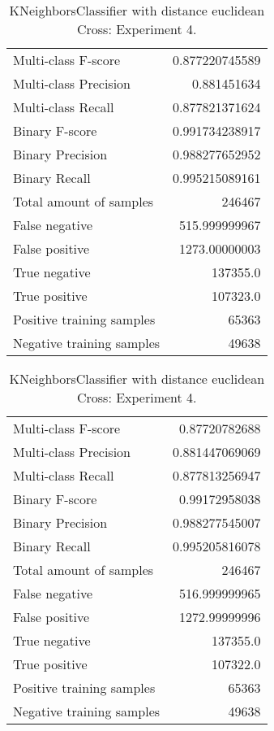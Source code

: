 \begin{table}[H]
\begin{minipage}{0.5\textwidth}
\caption{KNeighborsClassifier with distance euclidean Cross: Experiment 3.}
\centering
\begin{tabular}{l r}
\toprule
Multi-class F-score & 0.877220745589 \\
Multi-class Precision & 0.881451634 \\
Multi-class Recall & 0.877821371624 \\
\midrule
Binary F-score & 0.991734238917 \\
Binary Precision & 0.988277652952 \\
Binary Recall & 0.995215089161 \\
\midrule
Total amount of samples & 246467 \\
False negative & 515.999999967 \\
False positive & 1273.00000003 \\
True negative & 137355.0 \\
True positive & 107323.0 \\
\midrule
Positive training samples & 65363 \\
Negative training samples & 49638 \\
\bottomrule
\end{tabular}
\end{minipage}
\hfillx
\begin{minipage}{0.5\textwidth}
\caption{KNeighborsClassifier with distance euclidean Cross: Experiment 4.}
\centering
\begin{tabular}{l r}
\toprule
Multi-class F-score & 0.87720782688 \\
Multi-class Precision & 0.881447069069 \\
Multi-class Recall & 0.877813256947 \\
\midrule
Binary F-score & 0.99172958038 \\
Binary Precision & 0.988277545007 \\
Binary Recall & 0.995205816078 \\
\midrule
Total amount of samples & 246467 \\
False negative & 516.999999965 \\
False positive & 1272.99999996 \\
True negative & 137355.0 \\
True positive & 107322.0 \\
\midrule
Positive training samples & 65363 \\
Negative training samples & 49638 \\
\bottomrule
\end{tabular}
\end{minipage}
\end{table}
